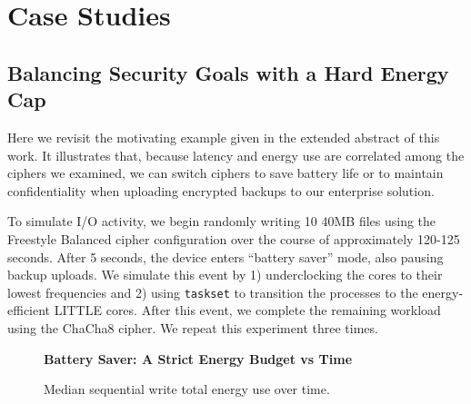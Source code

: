 \section{\sys{} Case Studies} \label{sec:usecases}


\subsection{Balancing Security Goals with a Hard Energy Cap} \label{subsec:uc1}

Here we revisit the motivating example given in the extended abstract
of this work. It illustrates that, because latency and energy use are
correlated among the ciphers we examined, we can switch ciphers to
save battery life or to maintain confidentiality when uploading
encrypted backups to our enterprise solution. 

To simulate I/O activity, we begin randomly writing 10 40MB files
using the Freestyle Balanced cipher configuration over the course of
approximately 120-125 seconds. After 5 seconds, the device enters
``battery saver'' mode, also pausing backup uploads. We simulate this
event by 1) underclocking the cores to their lowest frequencies and 2)
using \texttt{taskset} to transition the \sys{} processes to the
energy-efficient LITTLE cores. After this event, we complete the
remaining workload using the ChaCha8 cipher. We repeat this experiment
three times. 

\begin{figure}[ht] \textbf{Battery Saver: A Strict Energy
   Budget vs Time}\par\medskip
   \centering
   {} \caption{Median sequential write total
   energy use over time.}
  \label{fig:usecase-battery}
\end{figure}

